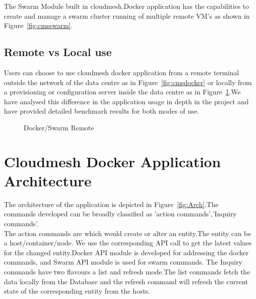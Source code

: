 \documentclass[9pt,twocolumn,twoside]{../../styles/osajnl}
\begin{document}
The Swarm Module built in cloudmesh.Docker application has the capabilities to create and manage a swarm cluster running of multiple remote VM's as shown in Figure~\ref{fig:cmsswarm}. 
\subsection{Remote vs Local use}
Users can choose to use cloudmesh docker application from a remote terminal outside the network of the data centre as in Figure~\ref{fig:cmsdocker} or locally from a provisioning or configuration server inside the data centre as in Figure~\ref{fig:cmsdocker-2}.We have analysed this difference in the application usage in depth in the project and have provided detailed benchmark results for both modes of use.
\begin{figure}[h!]
\centering
{}
\caption{Docker/Swarm Remote }
\label{fig:cmsdocker-2}
\end{figure}



\section{Cloudmesh Docker Application Architecture}
The architecture of the application is depicted in Figure~\ref{fig:Arch}.The commands developed can be broadly classified as 'action commands','Inquiry commands'.\\
The action commands are which would create or alter an entity.The entity can be a host/container/node. We use the corresponding API call to get the latest values for the changed entity.Docker API module is developed for addressing the docker commands, and Swarm API module is used for swarm commands.
The Inquiry commands have two flavours a list and refresh mode.The list commands fetch the data locally from the Database and the refresh command will refresh the current state of the corresponding entity from the hosts.
\end{document}
